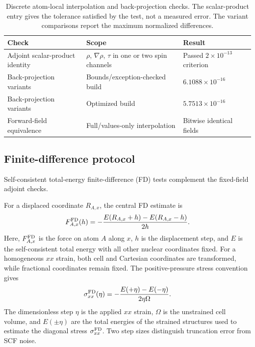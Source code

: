 \documentclass[10pt,a4paper]{article}
\begin{document}
\begin{table}[htbp]

\centering\small
\caption{Discrete atom-local interpolation and back-projection checks. The scalar-product entry gives the tolerance satisfied by the test, not a measured error. The variant comparisons report the maximum normalized differences.}
\label{tab:adjoint-validation}
\begin{tabular}{@{}p{}p{}p{}@{}}
\toprule
Check & Scope & Result \\
\midrule
Adjoint scalar-product identity & $\rho$, $\nabla\rho$, $\tau$ in one or two spin channels & Passed $2\times10^{-13}$ criterion \\
Back-projection variants & Bounds/exception-checked build & $6.1088\times10^{-16}$ \\
Back-projection variants & Optimized build & $5.7513\times10^{-16}$ \\
Forward-field equivalence & Full/values-only interpolation & Bitwise identical fields \\
\bottomrule
\end{tabular}
\end{table}

\FloatBarrier

\subsection{Finite-difference protocol}
\label{sec:fd}

Self-consistent total-energy finite-difference (FD) tests complement the fixed-field adjoint checks.

For a displaced coordinate $R_{A,x}$, the central FD estimate is
\begin{equation}
 F^{\rm FD}_{A,x}(h)=-\frac{E(R_{A,x}+h)-E(R_{A,x}-h)}{2h}.
\end{equation}
Here, $F^{\rm FD}_{A,x}$ is the force on atom $A$ along $x$, $h$ is the displacement step, and $E$ is the self-consistent total energy with all other nuclear coordinates fixed.
For a homogeneous $xx$ strain, both cell and Cartesian coordinates are transformed, while fractional coordinates remain fixed. The positive-pressure stress convention gives
\begin{equation}
 \sigma_{xx}^{\rm FD}(\eta)=-\frac{E(+\eta)-E(-\eta)}{2\eta\Omega}.
\end{equation}
The dimensionless step $\eta$ is the applied $xx$ strain, $\Omega$ is the unstrained cell volume, and $E(\pm\eta)$ are the total energies of the strained structures used to estimate the diagonal stress $\sigma_{xx}^{\rm FD}$.
Two step sizes distinguish truncation error from SCF noise.
\end{document}
